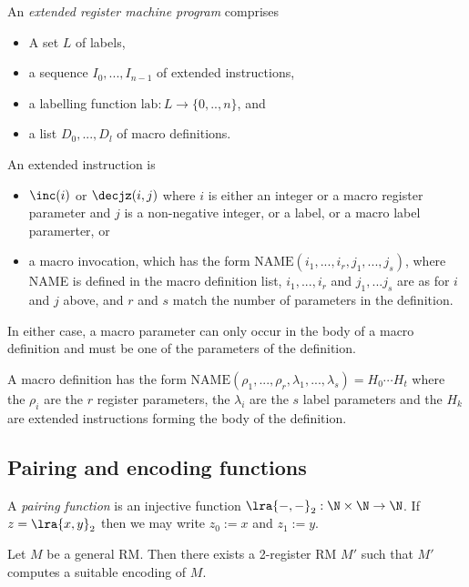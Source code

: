 \documentclass{article}
\begin{document}
\begin{definition}[Notes I.3]
    An \emph{extended register machine program} comprises
    \begin{itemize}
        \item A set $L$ of labels,
        \item a sequence $I_0,...,I_{n-1}$ of extended instructions,
        \item a labelling function $\text{lab}:L\to\{0,..,n\}$, and
        \item a list $D_0,...,D_l$ of macro definitions.
    \end{itemize}
    An extended instruction is
    \begin{itemize}
        \item $\inc(i)$ or $\decjz(i,j)$ where $i$ is either an integer or a macro
              register parameter and $j$ is a non-negative integer, or a label, or
              a macro label paramerter, or
        \item a macro invocation, which has the form $\text{NAME}(i_1,...,i_r,j_1,...,j_s)$,
              where NAME is defined in the macro definition list, $i_1,...,i_r$ and $j_1,...j_s$
              are as for $i$ and $j$ above, and $r$ and $s$ match the number of parameters
              in the definition.
    \end{itemize}
    In either case, a macro parameter can only occur in the body of a macro definition
    and must be one of the parameters of the definition.

    A macro definition has the form $\text{NAME}(\rho_1,...,\rho_r,\lambda_1,...,\lambda_s)=H_0\cdots H_t$
    where the $\rho_i$ are the $r$ register parameters, the $\lambda_i$ are the $s$
    label parameters and the $H_k$ are extended instructions forming the body of the
    definition.
\end{definition}

\subsection{Pairing and encoding functions}

\begin{definition}[Notes I.5]
    A \emph{pairing function} is an injective function $\lra{-,-}_2:\N\times\N\to\N$.
    If $z=\lra{x,y}_2$ then we may write $z_0:=x$ and $z_1:=y$.
\end{definition}

\begin{theorem}
    Let $M$ be a general RM. Then there exists a 2-register RM $M'$ such that
    $M'$ computes a suitable encoding of $M$.
\end{theorem}
\end{document}
